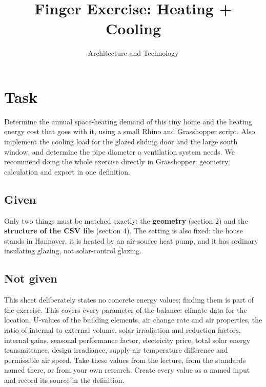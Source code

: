 \title{Finger Exercise: Heating + Cooling}
\author{Architecture and Technology}
\date{}
\newcommand{\EnergyDecimal}{.}
\newcommand{\EnergyWordElement}{Element}
\newcommand{\EnergyWordEnvelope}{Building envelope}
\newcommand{\EnergyWordFloor}{Usable floor area}
\newcommand{\EnergyWordWindowSouth}{South window}
\newcommand{\EnergyWordDoorEast}{East sliding door}
\newcommand{\EnergyWordAxonometry}{Axonometry}
\newcommand{\EnergyWordCoordinates}{Coordinates in metres}
\newcommand{\EnergyWordCsvExample}{Row structure}
\newcommand{\EnergyWordCsvRows}{Rows of the template}
\newcommand{\EnergyWordCanopy}{Canopy}

\makeassignmentcover
\section{Task}
Determine the annual space-heating demand of this tiny home and the heating energy cost that goes with it, using a small Rhino and Grasshopper script. Also implement the cooling load for the glazed sliding door and the large south window, and determine the pipe diameter a ventilation system needs. We recommend doing the whole exercise directly in Grasshopper: geometry, calculation and export in one definition.

\subsection{Given}
Only two things must be matched exactly: the \textbf{geometry} (section 2) and the \textbf{structure of the CSV file} (section 4). The setting is also fixed: the house stands in Hannover, it is heated by an air-source heat pump, and it has ordinary insulating glazing, not solar-control glazing.

\subsection{Not given}
This sheet deliberately states no concrete energy values; finding them is part of the exercise. This covers every parameter of the balance: climate data for the location, U-values of the building elements, air change rate and air properties, the ratio of internal to external volume, solar irradiation and reduction factors, internal gains, seasonal performance factor, electricity price, total solar energy transmittance, design irradiance, supply-air temperature difference and permissible air speed. Take these values from the lecture, from the standards named there, or from your own research. Create every value as a named input and record its source in the definition.

